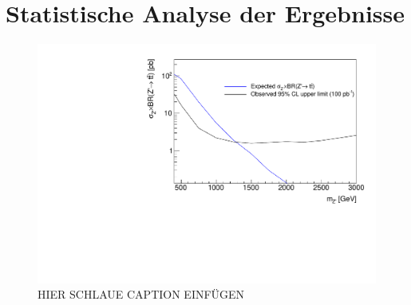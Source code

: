 \section{Statistische Analyse der Ergebnisse}
\label{sec:chi}

\begin{figure}[H]
    \centering
    \includegraphics[width=\linewidth]{plots_and_txt/limits.pdf}
    \caption{HIER SCHLAUE CAPTION EINFÜGEN}
    \label{fig:limit}
\end{figure}